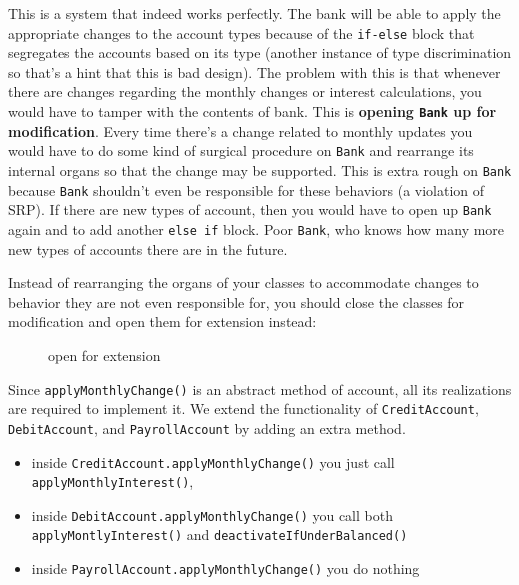 This is a system that indeed works perfectly. The bank will be able to
apply the appropriate changes to the account types because of the
\texttt{if-else} block that segregates the accounts based on its type
(another instance of type discrimination so that's a hint that this is
bad design). The problem with this is that whenever there are changes
regarding the monthly changes or interest calculations, you would have
to tamper with the contents of bank. This is \textbf{opening
\texttt{Bank} up for modification}. Every time there's a change related
to monthly updates you would have to do some kind of surgical procedure
on \texttt{Bank} and rearrange its internal organs so that the change
may be supported. This is extra rough on \texttt{Bank} because
\texttt{Bank} shouldn't even be responsible for these behaviors (a
violation of SRP). If there are new types of account, then you would
have to open up \texttt{Bank} again and to add another \texttt{else\ if}
block. Poor \texttt{Bank}, who knows how many more new types of accounts
there are in the future.

Instead of rearranging the organs of your classes to accommodate changes
to behavior they are not even responsible for, you should close the
classes for modification and open them for extension instead:

\begin{figure}
\centering
{}
\caption{open for extension}
\end{figure}

Since \texttt{applyMonthlyChange()} is an abstract method of account,
all its realizations are required to implement it. We extend the
functionality of \texttt{CreditAccount}, \texttt{DebitAccount}, and
\texttt{PayrollAccount} by adding an extra method.

\begin{itemize}
\tightlist
\item
  inside \texttt{CreditAccount.applyMonthlyChange()} you just call
  \texttt{applyMonthlyInterest()},\\
\item
  inside \texttt{DebitAccount.applyMonthlyChange()} you call both
  \texttt{applyMontlyInterest()} and
  \texttt{deactivateIfUnderBalanced()}
\item
  inside \texttt{PayrollAccount.applyMonthlyChange()} you do nothing
\end{itemize}

